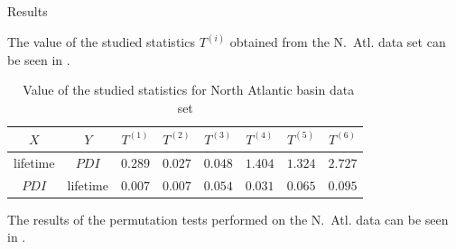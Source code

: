 \vspace*{0.75cm}
\begin{block}{Results}



	The value of the studied statistics $T^{(i)}$ obtained from the N.~Atl. data set can be seen in .
	\begin{table}[H]
		\centering
		\begin{tabular}{cccccccc}
		\toprule
		\toprule
		$X$   & $Y$   & $T^{(1)}$ & $T^{(2)}$ & $T^{(3)}$ & $T^{(4)}$ & $T^{(5)}$ & $T^{(6)}$ \\
		\midrule
		lifetime & $PDI$ & $0.289$ & $0.027$ & $0.048$ & $1.404$ & $1.324$ & $2.727$ \\
		$PDI$ & lifetime & $0.007$ & $0.007$ & $0.054$ & $0.031$ & $0.065$ & $0.095$ \\
		\bottomrule
		\end{tabular}
		\caption{~Value of the studied statistics for North Atlantic basin data set}
		\label{tab:perm-natl-ols-T}
	\end{table}

	The results of the permutation tests performed on the N.~Atl. data can be seen in .


\end{block}
